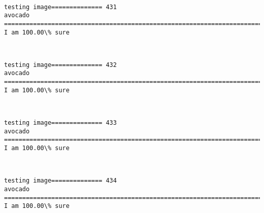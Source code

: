 \documentclass[11pt]{article}
\begin{document}
    \begin{center}
    \end{center}
    { \hspace*{\fill} \\}
    
    \begin{Verbatim}[commandchars=\\\{\}]
testing image============== 431
avocado
============================================================================
I am 100.00\% sure

    \end{Verbatim}

    \begin{center}
    \end{center}
    { \hspace*{\fill} \\}
    
    \begin{Verbatim}[commandchars=\\\{\}]
testing image============== 432
avocado
============================================================================
I am 100.00\% sure

    \end{Verbatim}

    \begin{center}
    \end{center}
    { \hspace*{\fill} \\}
    
    \begin{Verbatim}[commandchars=\\\{\}]
testing image============== 433
avocado
============================================================================
I am 100.00\% sure

    \end{Verbatim}

    \begin{center}
    \end{center}
    { \hspace*{\fill} \\}
    
    \begin{Verbatim}[commandchars=\\\{\}]
testing image============== 434
avocado
============================================================================
I am 100.00\% sure

    \end{Verbatim}
\end{document}

